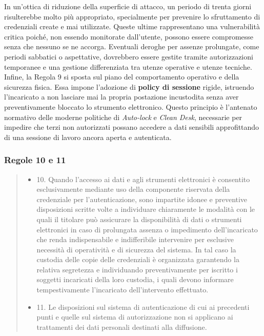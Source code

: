 In un'ottica di riduzione della superficie di attacco, un periodo di trenta giorni risulterebbe molto più appropriato, specialmente per prevenire lo sfruttamento di credenziali create e mai utilizzate.
Queste ultime rappresentano una vulnerabilità critica poiché, non essendo monitorate dall'utente, possono essere compromesse senza che nessuno se ne accorga.
Eventuali deroghe per assenze prolungate, come periodi sabbatici o aspettative, dovrebbero essere gestite tramite autorizzazioni temporanee e una gestione differenziata tra utenze operative e utenze tecniche.
Infine, la Regola 9 si sposta sul piano del comportamento operativo e della sicurezza fisica.
Essa impone l'adozione di \textbf{policy di sessione} rigide, istruendo l'incaricato a non lasciare mai la propria postazione incustodita senza aver preventivamente bloccato lo strumento elettronico.
Questo principio è l'antenato normativo delle moderne politiche di \textit{Auto-lock} e \textit{Clean Desk}, necessarie per impedire che terzi non autorizzati possano accedere a dati sensibili approfittando di una sessione di lavoro ancora aperta e autenticata.
\subsubsection*{Regole 10 e 11}
\begin{quote}
    \begin{itemize}
        \item 10. Quando l'accesso ai dati e agli strumenti elettronici è consentito esclusivamente mediante uso della componente riservata della credenziale per l'autenticazione, sono impartite idonee e preventive disposizioni scritte volte a individuare chiaramente le modalità con le quali il titolare può assicurare la disponibilità di dati o strumenti elettronici in caso di prolungata assenza o impedimento dell'incaricato che renda indispensabile e indifferibile intervenire per esclusive necessità di operatività e di sicurezza del sistema.
        In tal caso la custodia delle copie delle credenziali è organizzata garantendo la relativa segretezza e individuando preventivamente per iscritto i soggetti incaricati della loro custodia, i quali devono informare tempestivamente l'incaricato dell'intervento effettuato.
        \item 11. Le disposizioni sul sistema di autenticazione di cui ai precedenti punti e quelle sul sistema di autorizzazione non si applicano ai trattamenti dei dati personali destinati alla diffusione.
    \end{itemize}
\end{quote}

